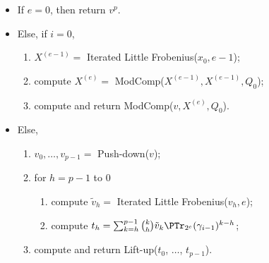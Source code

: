 \begin{figure}[!htb]
  \begin{itemize}
  \item \label{alg:l-frob:base-n} If $e = 0$, then return $v^p$.
  \item \label{alg:l-frob:modcomp} Else, if $i=0$,
    \begin{enumerate}
    \item \label{alg:l-frob:rec1} $X^{(e-1)}=$ Iterated Little Frobenius($x_0, e-1$);
    \item \label{alg:l-frob:e}compute $X^{(e)}=$ ModComp($X^{(e-1)},X^{(e-1)},Q_0$);
    \item \label{alg:l-frob:v-e} compute and return
      ModComp($v,X^{(e)},Q_0$).
    \end{enumerate}
  \item \label{alg:l-frob:i}Else,
    \begin{enumerate}
    \item \label{alg:l-frob:push} $v_0, \ldots, v_{p-1} = $
      Push-down($v$);
    \item \label{alg:l-frob:for} for $h = p-1$ to $0$
      \begin{enumerate}
      \item \label{alg:l-frob:rec} compute $\tilde{v}_h = $ Iterated
	Little Frobenius($v_h, e$);
      \item \label{alg:l-frob:comp} compute $t_h = \sum_{k=h}^{p-1}
	\binom{k}{h}\tilde{v}_k\PTr_{2^e}(\gamma_{i-1})^{k-h}$;
      \end{enumerate}
    \item \label{alg:l-frob:lift} compute and return Lift-up($t_0$,
    $\ldots$, $t_{p-1}$).
    \end{enumerate}
  \end{itemize}
\end{figure}

